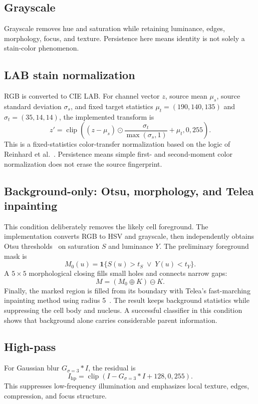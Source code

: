\subsection{Grayscale}
Grayscale removes hue and saturation while retaining luminance, edges, morphology, focus, and texture. Persistence here means identity is not solely a stain-color phenomenon.

\subsection{LAB stain normalization}
RGB is converted to CIE LAB. For channel vector $z$, source mean $\mu_s$, source standard deviation $\sigma_s$, and fixed target statistics $\mu_t=(190,140,135)$ and $\sigma_t=(35,14,14)$, the implemented transform is
\begin{equation}
z'=\operatorname{clip}\left((z-\mu_s)\odot\frac{\sigma_t}{\max(\sigma_s,1)}+\mu_t,0,255\right).
\end{equation}
This is a fixed-statistics color-transfer normalization based on the logic of Reinhard et al.~\cite{reinhard2001color}. Persistence means simple first- and second-moment color normalization does not erase the source fingerprint.

\subsection{Background-only: Otsu, morphology, and Telea inpainting}

This condition deliberately removes the likely cell foreground. The implementation converts RGB to HSV and grayscale, then independently obtains Otsu thresholds~\cite{otsu1979threshold} on saturation $S$ and luminance $Y$. The preliminary foreground mask is
\begin{equation}
M_0(u)=\mathbf{1}\{S(u)>t_S\;\lor\;Y(u)<t_Y\}.
\end{equation}
A $5\times5$ morphological closing fills small holes and connects narrow gaps:
\begin{equation}
M=(M_0\oplus K)\ominus K.
\end{equation}
Finally, the marked region is filled from its boundary with Telea's fast-marching inpainting method using radius 5~\cite{telea2004inpainting}. The result keeps background statistics while suppressing the cell body and nucleus. A successful classifier in this condition shows that background alone carries considerable parent information.

\subsection{High-pass}
For Gaussian blur $G_{\sigma=3}*I$, the residual is
\begin{equation}
I_{\mathrm{hp}}=\operatorname{clip}\left(I-G_{\sigma=3}*I+128,0,255\right).
\end{equation}
This suppresses low-frequency illumination and emphasizes local texture, edges, compression, and focus structure.

